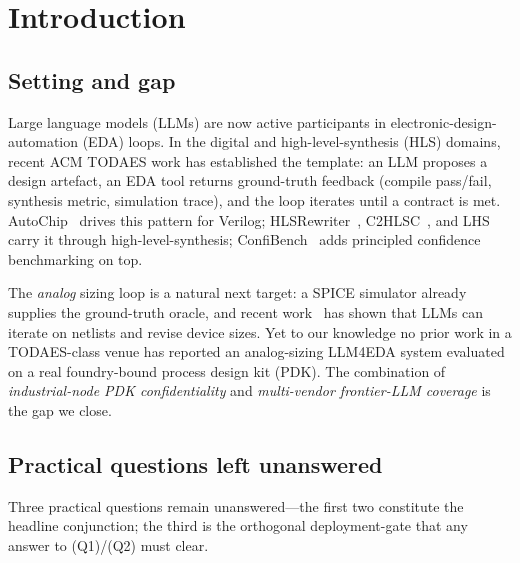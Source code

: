 
\section{Introduction}
\label{sec:intro}

\subsection{Setting and gap}
\label{sec:intro-gap}

Large language models (LLMs) are now active participants in
electronic-design-automation (EDA) loops. In the digital and
high-level-synthesis (HLS) domains, recent ACM TODAES work has
established the template: an LLM proposes a design artefact, an EDA
tool returns ground-truth feedback (compile pass/fail, synthesis
metric, simulation trace), and the loop iterates until a contract
is met. AutoChip~\cite{autochip} drives this pattern for Verilog;
HLSRewriter~\cite{hlsrewriter}, C2HLSC~\cite{c2hlsc}, and
LHS~\cite{lhs} carry it through high-level-synthesis;
ConfiBench~\cite{confibench} adds principled confidence
benchmarking on top.

The \emph{analog} sizing loop is a natural next target: a SPICE
simulator already supplies the ground-truth oracle, and recent
work~\cite{analogcoder,adollm,eesizer,anaflow,ledro,autosizer,analogsage}
has shown that LLMs can iterate on netlists and revise device sizes.
Yet to our knowledge no prior work in a TODAES-class venue has
reported an analog-sizing LLM4EDA system evaluated on a real
foundry-bound process design kit (PDK). The combination of
\emph{industrial-node PDK confidentiality} and \emph{multi-vendor
frontier-LLM coverage} is the gap we close.

\subsection{Practical questions left unanswered}
\label{sec:intro-questions}

Three practical questions remain unanswered---the first two
constitute the headline conjunction; the third is the orthogonal
deployment-gate that any answer to (Q1)/(Q2) must clear.

